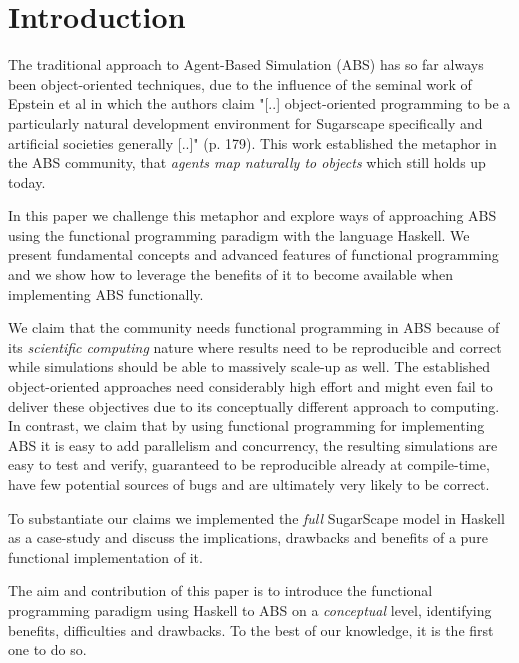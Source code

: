 \section{Introduction}
The traditional approach to Agent-Based Simulation (ABS) has so far always been object-oriented techniques, due to the influence of the seminal work of Epstein et al \cite{epstein_growing_1996} in which the authors claim "[..] object-oriented programming to be a particularly natural development environment for Sugarscape specifically and artificial societies generally [..]" (p. 179). This work established the metaphor in the ABS community, that \textit{agents map naturally to objects} \cite{north_managing_2007} which still holds up today.

In this paper we challenge this metaphor and explore ways of approaching ABS using the functional programming paradigm with the language Haskell. We present fundamental concepts and advanced features of functional programming and we show how to leverage the benefits of it \cite{hudak_haskell_1994, hudak_history_2007} to become available when implementing ABS functionally. 

We claim that the community needs functional programming in ABS because of its \textit{scientific computing} nature where results need to be reproducible and correct while simulations should be able to massively scale-up as well. The established object-oriented approaches need considerably high effort and might even fail to deliver these objectives due to its conceptually different approach to computing. In contrast, we claim that by using functional programming for implementing ABS it is easy to add parallelism and concurrency, the resulting simulations are easy to test and verify, guaranteed to be reproducible already at compile-time, have few potential sources of bugs and are ultimately very likely to be correct. 

To substantiate our claims we implemented the \textit{full} SugarScape \cite{epstein_growing_1996} model in Haskell as a case-study and discuss the implications, drawbacks and benefits of a pure functional implementation of it.

The aim and contribution of this paper is to introduce the functional programming paradigm using Haskell to ABS on a \textit{conceptual} level, identifying benefits, difficulties and drawbacks. To the best of our knowledge, it is the first one to do so. 
